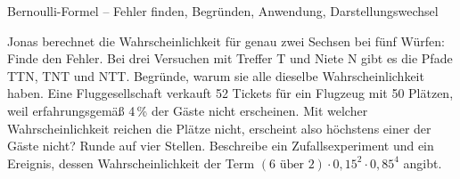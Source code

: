 \begin{aufgabe}{Bernoulli-Formel – Fehler finden, Begründen, Anwendung, Darstellungswechsel}
\begin{teile}
\teil Jonas berechnet die Wahrscheinlichkeit für genau zwei Sechsen bei fünf Würfen:  Finde den Fehler.
\teil Bei drei Versuchen mit Treffer T und Niete N gibt es die Pfade TTN, TNT und NTT. Begründe, warum sie alle dieselbe Wahrscheinlichkeit haben.
\teil Eine Fluggesellschaft verkauft 52 Tickets für ein Flugzeug mit 50 Plätzen, weil erfahrungsgemäß 4\,\% der Gäste nicht erscheinen. Mit welcher Wahrscheinlichkeit reichen die Plätze nicht, erscheint also höchstens einer der Gäste nicht? Runde auf vier Stellen.
\teil Beschreibe ein Zufallsexperiment und ein Ereignis, dessen Wahrscheinlichkeit der Term $(6 \text{ über } 2) \cdot 0{,}15^2 \cdot 0{,}85^4$ angibt.
\end{teile}
\end{aufgabe}
